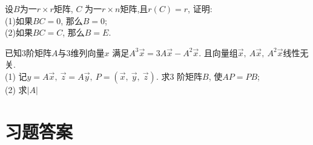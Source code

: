 \begin{ex}\label{4.28}
设$B$为一$r\times r$矩阵, $C$ 为一$r\times n$矩阵,且$r(C)=r$, 证明:\\
(1)如果$BC=0$, 那么$B=0$; \\
(2)如果$BC=C$, 那么$B=E$.
\end{ex}

\begin{ex}\label{4.29}
已知3阶矩阵$A$与3维列向量$x$ 满足$A^3 \vec{x}=3A\vec{x}-A^2\vec{x}$. 且向量组$\vec{x},\ A\vec{x},\ A^2\vec{x}$线性无关.\\
(1) 记$y=A\vec{x},\ \vec{z}=A\vec{y},\ P=(\vec{x},\ \vec{y},\ \vec{z})$. 求3 阶矩阵$B$, 使$AP=PB$;\\
(2) 求$|A|$
\end{ex}


\section{习题答案}

